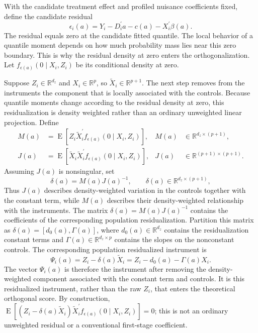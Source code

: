 With the candidate treatment effect and profiled nuisance coefficients fixed, define the candidate residual
\begin{equation}
    \epsilon_i(a)
    =Y_i-D_i^{\prime}a-c(a)-X_i^{\prime}\beta(a).
    \label{eq:profile-residual}
\end{equation}
The residual equals zero at the candidate fitted quantile. The local behavior of a quantile moment depends on how much probability mass lies near this zero boundary. This is why the residual density at zero enters the orthogonalization. Let $f_{\epsilon(a)}(0\mid X_i,Z_i)$ be its conditional density at zero.

Suppose $Z_i\in\mathbb{R}^{d_z}$ and $X_i\in\mathbb{R}^{p}$, so $\widetilde X_i\in\mathbb{R}^{p+1}$. The next step removes from the instruments the component that is locally associated with the controls. Because quantile moments change according to the residual density at zero, this residualization is density weighted rather than an ordinary unweighted linear projection. Define
\begin{equation}
    \begin{aligned}
        M(a)
        &=\operatorname{E}\!\left[
            Z_i\widetilde X_i^{\prime}f_{\epsilon(a)}(0\mid X_i,Z_i)
        \right],
        & M(a)&\in\mathbb{R}^{d_z\times(p+1)},\\
        J(a)
        &=\operatorname{E}\!\left[
            \widetilde X_i\widetilde X_i^{\prime}f_{\epsilon(a)}(0\mid X_i,Z_i)
        \right],
        & J(a)&\in\mathbb{R}^{(p+1)\times(p+1)}.
    \end{aligned}
    \label{eq:profile-MJ}
\end{equation}
Assuming $J(a)$ is nonsingular, set
\begin{equation}
    \delta(a)=M(a)J(a)^{-1},
    \qquad
    \delta(a)\in\mathbb{R}^{d_z\times(p+1)},
    \label{eq:profile-delta}
\end{equation}
Thus $J(a)$ describes density-weighted variation in the controls together with the constant term, while $M(a)$ describes their density-weighted relationship with the instruments. The matrix $\delta(a)=M(a)J(a)^{-1}$ contains the coefficients of the corresponding population residualization. Partition this matrix as $\delta(a)=[d_0(a),\Gamma(a)]$, where $d_0(a)\in\mathbb{R}^{d_z}$ contains the residualization constant terms and $\Gamma(a)\in\mathbb{R}^{d_z\times p}$ contains the slopes on the nonconstant controls. The corresponding population residualized instrument is
\begin{equation}
    \Psi_i(a)
    =Z_i-\delta(a)\widetilde X_i
    =Z_i-d_0(a)-\Gamma(a)X_i.
    \label{eq:profile-residualized-instrument}
\end{equation}
The vector $\Psi_i(a)$ is therefore the instrument after removing the density-weighted component associated with the constant term and controls. It is this residualized instrument, rather than the raw $Z_i$, that enters the theoretical orthogonal score. By construction, $\operatorname{E}[(Z_i-\delta(a)\widetilde X_i)\widetilde X_i^{\prime}f_{\epsilon(a)}(0\mid X_i,Z_i)]=0$; this is not an ordinary unweighted residual or a conventional first-stage coefficient.

